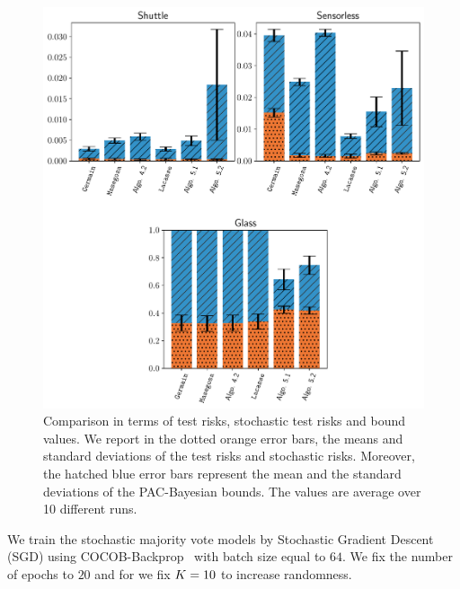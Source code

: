 \begin{figure}
    \centering
    \includegraphics[width=1.0\linewidth]{chapter_5/figures/tree_multi_2.pdf}
    \caption[Comparison of the Risks and the Bound Values (4/4)]{
    Comparison in terms of test risks, stochastic test risks and bound values. 
    We report in the dotted orange error bars, the means and standard deviations of the test risks and stochastic risks.
    Moreover, the hatched blue error bars represent the mean and the standard deviations of the PAC-Bayesian bounds.
    The values are average over 10 different runs.
    }
    \label{chap:mv-sto:fig:stump-multi-2}
\end{figure}

We train the stochastic majority vote models by Stochastic Gradient Descent (SGD) using COCOB-Backprop~\citep{OrabonaTommasi2017} with batch size equal to $64$.
We fix the number of epochs to $20$ and for  we fix $K=10$ to increase randomness.

